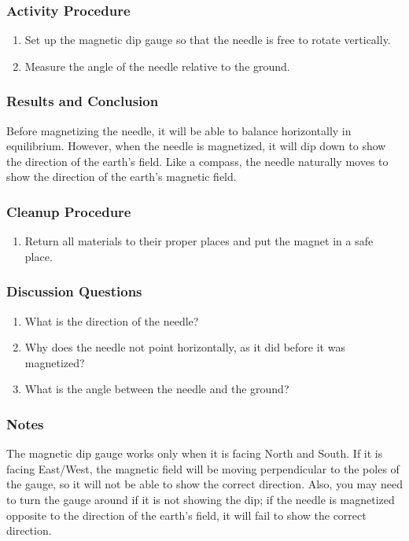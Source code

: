 \subsubsection*{Activity Procedure}
\begin{enumerate}
\item{Set up the magnetic dip gauge so that the needle is free to rotate vertically.}
\item{Measure the angle of the needle relative to the ground.}
\end{enumerate}

\subsubsection*{Results and Conclusion}
Before magnetizing the needle, it will be able to balance horizontally in equilibrium.  However, when the needle is magnetized, it will dip down to show the direction of the earth's field.  Like a compass, the needle naturally moves to show the direction of the earth's magnetic field.

\subsubsection*{Cleanup Procedure}
\begin{enumerate}
\item{Return all materials to their proper places and put the magnet in a safe place.}
\end{enumerate}

\subsubsection*{Discussion Questions}
\begin{enumerate}
\item{What is the direction of the needle?}
\item{Why does the needle not point horizontally, as it did before it was magnetized?}
\item{What is the angle between the needle and the ground?}
\end{enumerate}

\subsubsection*{Notes}
The magnetic dip gauge works only when it is facing North and South.  If it is facing East/West, the magnetic field will be moving perpendicular to the poles of the gauge, so it will not be able to show the correct direction.  Also, you may need to turn the gauge around if it is not showing the dip; if the needle is magnetized opposite to the direction of the earth's field, it will fail to show the correct direction.
